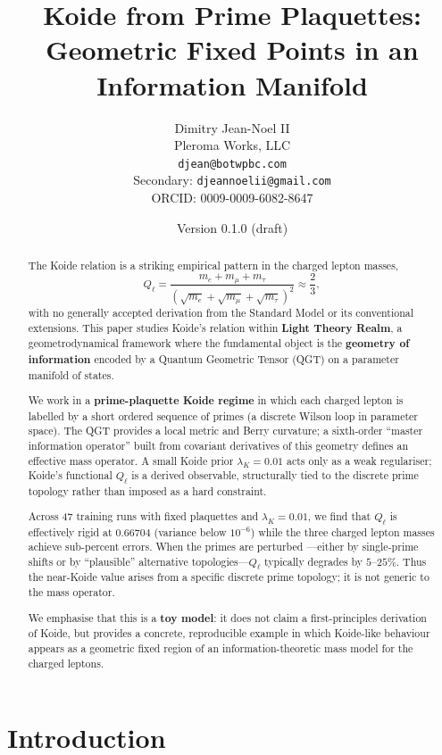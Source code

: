 \documentclass[12pt]{article}
\title{Koide from Prime Plaquettes:\\
Geometric Fixed Points in an Information Manifold}
\author{Dimitry Jean-Noel II\\Pleroma Works, LLC\\\texttt{djean@botwpbc.com}\\Secondary: \texttt{djeannoelii@gmail.com}\\ORCID: 0009-0009-6082-8647}
\date{Version 0.1.0 (draft)}
\begin{document}
\maketitle

\begin{abstract}
The Koide relation is a striking empirical pattern in the charged lepton masses,
\[
Q_\ell = \frac{m_e + m_\mu + m_\tau}{\left(\sqrt{m_e} + \sqrt{m_\mu} + \sqrt{m_\tau}\right)^2} \approx \frac{2}{3},
\]
with no generally accepted derivation from the Standard Model or its conventional
extensions. This paper studies Koide's relation within \textbf{Light Theory Realm}, a
geometrodynamical framework where the fundamental object is the \textbf{geometry of
information} encoded by a Quantum Geometric Tensor (QGT) on a parameter manifold
of states.

We work in a \textbf{prime-plaquette Koide regime} in which each charged lepton is
labelled by a short ordered sequence of primes (a discrete Wilson loop in parameter
space). The QGT provides a local metric and Berry curvature; a sixth-order ``master
information operator'' built from covariant derivatives of this geometry defines an
effective mass operator. A small Koide prior $\lambda_K = 0.01$ acts only as a weak
regulariser; Koide's functional $Q_\ell$ is a derived observable, structurally tied to
the discrete prime topology rather than imposed as a hard constraint.

Across 47 training runs with fixed plaquettes and $\lambda_K = 0.01$, we find that
$Q_\ell$ is effectively rigid at $0.66704$ (variance below $10^{-6}$) while the three
charged lepton masses achieve sub-percent errors. When the primes are perturbed
—either by single-prime shifts or by ``plausible'' alternative topologies—$Q_\ell$
typically degrades by $5$–$25\%$. Thus the near-Koide value arises from a specific
discrete prime topology; it is not generic to the mass operator.

We emphasise that this is a \textbf{toy model}: it does not claim a first-principles derivation
of Koide, but provides a concrete, reproducible example in which Koide-like behaviour
appears as a geometric fixed region of an information-theoretic mass model for the
charged leptons.
\end{abstract}

\section{Introduction}
\label{sec:intro}
\end{document}
